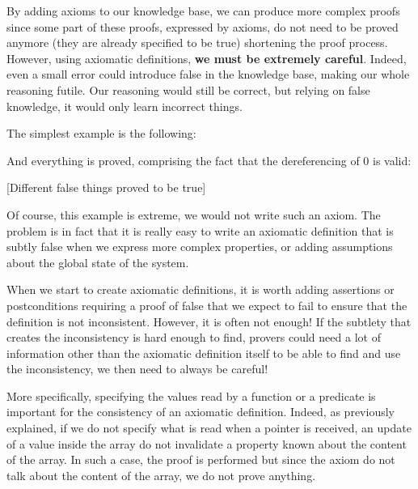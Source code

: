 

By adding axioms to our knowledge base, we can produce more complex
proofs since some part of these proofs, expressed by axioms, do not need
to be proved anymore (they are already specified to be true) shortening
the proof process. However, using axiomatic definitions, \textbf{we must
be extremely careful}. Indeed, even a small error could introduce false
in the knowledge base, making our whole reasoning futile. Our reasoning
would still be correct, but relying on false knowledge, it would only
learn incorrect things.



The simplest example is the following:






And everything is proved, comprising the fact that the dereferencing of
0 is valid:



[Different false things proved to be true]


Of course, this example is extreme, we would not write such an axiom.
The problem is in fact that it is really easy to write an axiomatic
definition that is subtly false when we express more complex properties,
or adding assumptions about the global state of the system.




When we start to create axiomatic definitions, it is worth adding
assertions or postconditions requiring a proof of false that we expect
to fail to ensure that the definition is not inconsistent. However, it
is often not enough! If the subtlety that creates the inconsistency is
hard enough to find, provers could need a lot of information other than
the axiomatic definition itself to be able to find and use the
inconsistency, we then need to always be careful!




More specifically, specifying the values read by a function or a
predicate is important for the consistency of an axiomatic definition.
Indeed, as previously explained, if we do not specify what is read when
a pointer is received, an update of a value inside the array do not
invalidate a property known about the content of the array. In such a
case, the proof is performed but since the axiom do not talk about the
content of the array, we do not prove anything.




